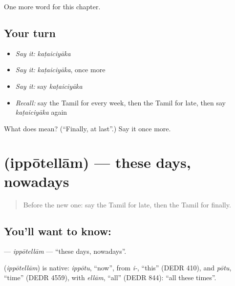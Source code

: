 \begin{grammarlens}[title={What you've built}]
One more word for this chapter.
\end{grammarlens}

\subsection*{Your turn}
\begin{itemize}
\raggedright
  \item \emph{Say it:} \emph{kaṭaiciyāka}
  \item \emph{Say it:} \emph{kaṭaiciyāka}, once more
  \item \emph{Say it:} say \emph{kaṭaiciyāka}
  \item \emph{Recall:} say the Tamil for every week, then the Tamil for late, then say \emph{kaṭaiciyāka} again
\end{itemize}

\begin{tcolorbox}[breakable,colback=teal!4,colframe=teal!35!black,title={Before you move on}]
What does  mean? (\textquotedblleft{}Finally, at last\textquotedblright{}.) Say it once more.
\end{tcolorbox}
\section[\texorpdfstring{\ta{இப்போதெல்லாம்} (ippōtellām)}{இப்போதெல்லாம் (ippōtellām)}]{ (ippōtellām) — these days, nowadays}

\label{lesson:TA-C262-ippotellam}



\begin{quote}
Before the new one: say the Tamil for late, then the Tamil for finally.
\end{quote}

\subsection*{You'll want to know: }
\textbf{} — \emph{ippōtellām} — \textquotedblleft{}these days, nowadays\textquotedblright{}.

\begin{cousinweb}
\textbf{} (\emph{ippōtellām}) is native: \emph{ippōtu}, \textquotedblleft{}now\textquotedblright{}, from \emph{i-}, \textquotedblleft{}this\textquotedblright{} (DEDR 410), and \emph{pōtu}, \textquotedblleft{}time\textquotedblright{} (DEDR 4559), with \emph{ellām}, \textquotedblleft{}all\textquotedblright{} (DEDR 844): \textquotedblleft{}all these times\textquotedblright{}.
\end{cousinweb}

